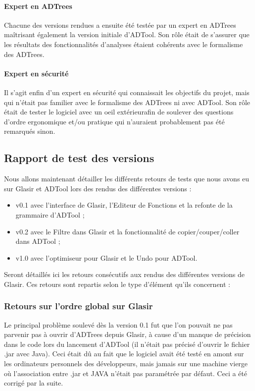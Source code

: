 \paragraph{Expert en ADTrees} Chacune des versions rendues a ensuite été testée par un expert en ADTrees maîtrisant également la version initiale d'ADTool. Son rôle était de s'assurer que les résultats des fonctionnalités d'analyses étaient cohérents avec le formalisme des ADTrees.

\paragraph{Expert en sécurité} Il s'agit enfin d'un expert en sécurité qui connaissait les objectifs du projet, mais qui n'était pas familier avec le formalisme des ADTrees ni avec ADTool. Son rôle était de tester le logiciel avec un oeil \og{}extérieur\fg afin de soulever des questions d'ordre ergonomique et/ou pratique qui n'auraient probablement pas été remarqués sinon.

\subsection{Rapport de test des versions}
\label{subsec:tests}

Nous allons maintenant détailler les différents retours de tests que nous avons eu sur Glasir et ADTool lors des rendus des différentes versions : 
\begin{itemize}
	\item v0.1 avec l'interface de Glasir, l'Editeur de Fonctions et la refonte de la grammaire d'ADTool ;
	\item v0.2 avec le Filtre dans Glasir et la fonctionnalité de copier/couper/coller dans ADTool ;
	\item v1.0 avec l'optimiseur pour Glasir et le Undo pour ADTool.
\end{itemize}
Seront détaillés ici les retours consécutifs aux rendus des différentes versions de Glasir. Ces retours sont repartis selon le type d'élément qu'ils concernent :

\subsubsection{Retours sur l'ordre global sur Glasir}
\label{subsubsec:fonctglob}

Le principal problème soulevé dès la version 0.1 fut que l'on pouvait ne pas parvenir pas à ouvrir d'ADTrees depuis Glasir, à cause d'un manque de précision dans le code lors du lancement d'ADTool (il n'était pas précisé d'ouvrir le fichier .jar avec Java). Ceci était dû au fait que le logiciel avait été testé en amont sur les ordinateurs personnels des développeurs, mais jamais sur une machine vierge où l'association entre .jar et JAVA n'était pas paramétrée par défaut. Ceci a été corrigé par la suite. 

